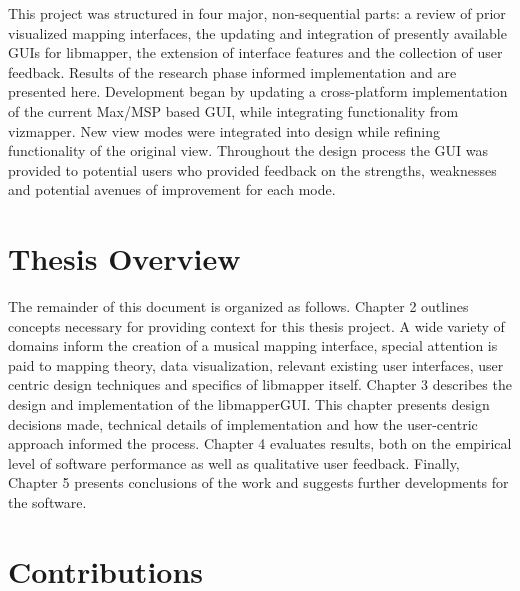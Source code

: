 This project was structured in four major, non-sequential parts: a review of prior visualized mapping interfaces, the updating and integration of presently available GUIs for libmapper, the extension of interface features and the collection of user feedback. Results of the research phase informed implementation and are presented here. Development began by updating a cross-platform implementation of the current Max/MSP based GUI, while integrating functionality from vizmapper. New view modes were integrated into design while refining functionality of the original view. Throughout the design process the GUI was provided to potential users who provided feedback on the strengths, weaknesses and potential avenues of improvement for each mode.

\section{Thesis Overview}

The remainder of this document is organized as follows. Chapter 2 outlines concepts necessary for providing context for this thesis project. A wide variety of domains inform the creation of a musical mapping interface, special attention is paid to mapping theory, data visualization, relevant existing user interfaces, user centric design techniques and specifics of libmapper itself. Chapter 3 describes the design and implementation of the libmapperGUI. This chapter presents design decisions made, technical details of implementation and how the user-centric approach informed the process. Chapter 4 evaluates results, both on the empirical level of software performance as well as qualitative user feedback. Finally, Chapter 5 presents conclusions of the work and suggests further developments for the software.

\section{Contributions}

